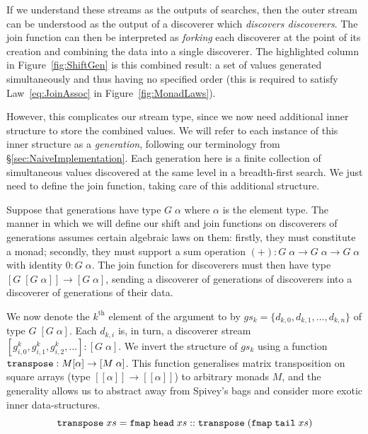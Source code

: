 If we understand these streams as the outputs of searches, then the outer stream can be understood as the output of a discoverer which \emph{discovers discoverers}. The join function can then be interpreted as \emph{forking} each discoverer at the point of its creation and combining the data into a single discoverer. The highlighted column in Figure~\ref{fig:ShiftGen} is this combined result: a set of values generated simultaneously and thus having no specified order (this is required to satisfy Law~\ref{eq:JoinAssoc} in Figure~\ref{fig:MonadLaws}).

However, this complicates our stream type, since we now need additional inner structure to store the combined values. We will refer to each instance of this inner structure as a \emph{generation}, following our terminology from \S\ref{sec:NaiveImplementation}. Each generation here is a finite collection of simultaneous values discovered at the same level in a breadth-first search. We just need to define the join function, taking care of this additional structure.

Suppose that generations have type $G\;\alpha$ where $\alpha$ is the element type. The manner in which we will define our shift and join functions on discoverers of generations assumes certain algebraic laws on them: firstly, they must constitute a monad; secondly, they must support a sum operation \mbox{$(+):G\;\alpha\rightarrow G\;\alpha\rightarrow G\;\alpha$} with identity $0:G\;\alpha$. The join function for discoverers must then have type $[G\;[G\;\alpha]] \rightarrow [G\;\alpha]$, sending a discoverer of generations of discoverers into a discoverer of generations of their data. 

We now denote the $k^{\text{th}}$ element of the argument to  by $gs_k = \{d_{k,0}, d_{k,1}, \ldots, d_{k,n}\}$ of type $G\;[G\;\alpha]$. Each $d_{k,i}$ is, in turn, a discoverer stream $[g^k_{i,0}, g^k_{i,1}, g^k_{i,2}, \ldots] : [G\;\alpha]$. We invert the structure of $gs_k$ using a function $\texttt{transpose}  : M[\alpha]\rightarrow [M\;\alpha]$. This function generalises matrix transposition on square arrays (type $[[\alpha]]\rightarrow[[\alpha]]$) to arbitrary monads $M$, and the generality allows us to abstract away from Spivey's bags and consider more exotic inner data-structures.
\begin{displaymath}
\texttt{transpose}\;xs = \texttt{fmap}\;\texttt{head}\;xs :: \texttt{transpose}\; (\texttt{fmap}\;\texttt{tail}\;xs)
\end{displaymath}

